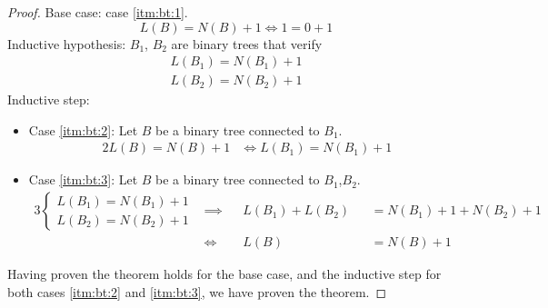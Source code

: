 \documentclass[docid=TP01]{tcom_TP}
\begin{document}
\begin{proof}
	Base case: case \ref{itm:bt:1}.
	\begin{equation*}
		L(B)=N(B)+1 \iff 1=0+1
	\end{equation*}
	Inductive hypothesis: $B_1$, $B_2$ are binary trees that verify
	\begin{gather*}
		L(B_1)=N(B_1)+1\\
		L(B_2)=N(B_2)+1
	\end{gather*}
	Inductive step:
	\begin{itemize}[label={}]
		\item Case \ref{itm:bt:2}: Let $B$ be a binary tree connected to $B_1$.
			\begin{alignat*}{2}
				L(B)=N(B)+1
				&\iff L(B_1)=N(B_1)+1
			\end{alignat*}
		\item Case \ref{itm:bt:3}: Let $B$ be a binary tree connected to $B_1$,$B_2$.
			\begin{alignat*}{3}
				\begin{cases}
					L(B_1)=N(B_1)+1\\
					L(B_2)=N(B_2)+1
				\end{cases}
				&\implies &&L(B_1)+L(B_2)&&=N(B_1)+1+N(B_2)+1 \\
				&\iff     &&L(B)         &&=N(B)+1
			\end{alignat*}
	\end{itemize}
	Having proven the theorem holds for the base case, and the inductive step for both cases \ref{itm:bt:2} and \ref{itm:bt:3}, we have proven the theorem.
\end{proof}
\end{document}
